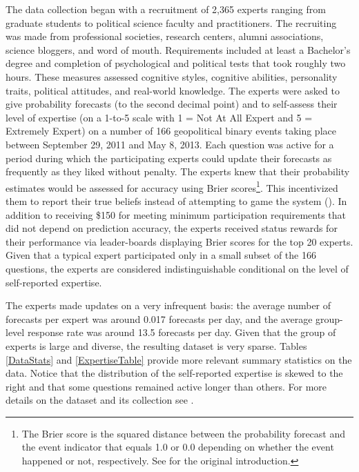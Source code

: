\documentclass[aoas, preprint]{imsart}
\numberwithin{equation}{section}
\theoremstyle{plain}
\begin{document}
The data collection began with a recruitment of 2,365 experts ranging from graduate students to political science faculty and practitioners. The recruiting was made from professional societies, research centers, alumni associations, science bloggers, and word of mouth. Requirements included at least a Bachelor's degree and completion of psychological and political tests that took roughly two hours. These measures assessed cognitive styles, cognitive abilities, personality traits, political attitudes, and real-world knowledge. The experts were asked to give probability forecasts (to the second decimal point) and to self-assess their level of expertise (on a 1-to-5 scale with 1 = Not At All Expert and 5 = Extremely Expert) on a number of 166 geopolitical binary events taking place between September 29, 2011 and May 8, 2013. Each question was active for a period during which the participating experts could update their forecasts as frequently as they liked without penalty. The experts knew that their probability estimates would be assessed for accuracy using Brier scores\footnote{The Brier score is the squared distance between the probability forecast and the event indicator that equals 1.0 or 0.0 depending on whether the event happened or not, respectively. See \citet{Brier} for the original introduction.}. This incentivized them to report their true beliefs instead of attempting to game the system (\citet{winkler1968good}). In addition to receiving \$150 for meeting minimum participation requirements that did not depend on prediction accuracy, the experts received status rewards for their performance via leader-boards displaying Brier scores for the top 20 experts. Given that a typical expert participated only in a small subset of the 166 questions, the experts are considered indistinguishable conditional on the level of self-reported expertise.


The experts made updates on a very infrequent basis: the average number of forecasts per expert was around 0.017 forecasts per day, and the average group-level response rate was around 13.5 forecasts per day. Given that the group of experts is large and diverse, the resulting dataset is very sparse. Tables \ref{DataStats} and \ref{ExpertiseTable} provide more relevant summary statistics on the data. Notice that the distribution of the self-reported expertise is skewed to the right and that some questions remained active longer than others.  For more details on the dataset and its collection see \citet{ungar2012good}.
\end{document}

